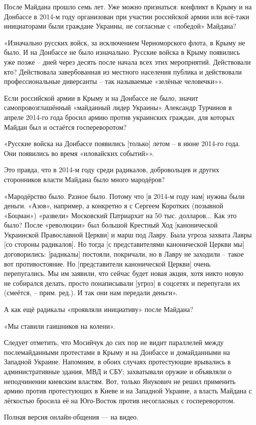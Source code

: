 После Майдана прошло семь лет. Уже можно признаться: конфликт в Крыму и на
Донбассе в 2014-м году организован при участии российской армии или всё-таки
инициаторами были граждане Украины, не согласные с «победой» Майдана?

«Изначально русских войск, за исключением Черноморского флота, в Крыму не было.
И на Донбассе не было изначально. Русские войска в Крыму появились уже позже –
дней через десять после начала всех этих мероприятий. Действовали кто?
Действовала завербованная из местного населения публика и действовали
профессиональные диверсанты – так называемые «зелёные человечки»».

Если российской армии в Крыму и на Донбассе не было, значит самопровозглашённый
«майданный лидер Украины» Александр Турчинов в апреле 2014-го года бросил армию
против украинских граждан, для которых Майдан был и остаётся госпереворотом?

«Русские войска на Донбассе появились [только] летом – в июне 2014-го года. Они
появились во время «иловайских событий»».

Это правда, что в 2014-м году среди радикалов, добровольцев и других
сторонников власти Майдана было много мародёров?

«Мародёрство было. Разное было. Потому что [в 2014-м году нам] нужны были
деньги. «Азов», например, а конкретно я с Сергеем Коротких (позывной «Боцман»)
«развели» Московский Патриархат на 50 тыс. долларов... Как это было? После
«революции» был большой Крестный Ход [канонической Украинской Православной
Церкви] и марш под Лавру. Была угроза захвата Лавры [со стороны радикалов]. Но
тогда [с представителями канонической Церкви мы] договорились: [радикалы]
постояли, покричали, но в Лавру не заходили – такое вот противостояние. Но
[представители канонической Церкви] очень перепугались. Мы им заявили, что
сейчас будет новая акция, хотя никто новую не собирался делать, просто
понаписывали [угроз] в соцсетях и перепугали их (смеётся, – прим. ред.). И так
они нам передали деньги».

А как ещё радикалы «проявляли инициативу» после Майдана?

«Мы ставили гаишников на колени».

Следует отметить, что Мосийчук до сих пор не видит параллелей между
послемайданными протестами в Крыму и на Донбассе и домайданными на Западной
Украине. Напомним, в обоих случаях протестующие врывались в административные
здания, МВД и СБУ; захватывали оружие и объявляли о неподчинении киевским
властям. Вот, только Янукович не решил применить армию против протестующих в
Киеве и на Западной Украине, а власть Майдана с лёгкостью бросила её на
Юго-Восток против несогласных с госпереворотом.

Полная версия онлайн-общения — на видео.

